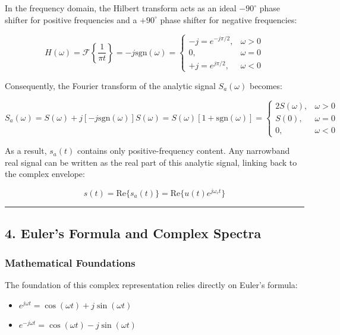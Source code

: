 \documentclass[
]{article}
\providecommand{\tightlist}{%
  \setlength{\itemsep}{0pt}\setlength{\parskip}{0pt}}
\begin{document}
In the frequency domain, the Hilbert transform acts as an ideal
\(-90^\circ\) phase shifter for positive frequencies and a \(+90^\circ\)
phase shifter for negative frequencies:

\[H(\omega) = \mathcal{F}\left\{\frac{1}{\pi t}\right\} = -j \text{sgn}(\omega) = \begin{cases} -j = e^{-j\pi/2}, & \omega > 0 \\ 0, & \omega = 0 \\ +j = e^{j\pi/2}, & \omega < 0 \end{cases}\]

Consequently, the Fourier transform of the analytic signal
\(S_a(\omega)\) becomes:

\[S_a(\omega) = S(\omega) + j [-j \text{sgn}(\omega)] S(\omega) = S(\omega) [1 + \text{sgn}(\omega)] = \begin{cases} 2S(\omega), & \omega > 0 \\ S(0), & \omega = 0 \\ 0, & \omega < 0 \end{cases}\]

As a result, \(s_a(t)\) contains only positive-frequency content. Any
narrowband real signal can be written as the real part of this analytic
signal, linking back to the complex envelope:

\[s(t) = \text{Re}\{ s_a(t) \} = \text{Re}\{ u(t) e^{j \omega_c t} \}\]

\begin{center}\rule{0.5\linewidth}{0.5pt}\end{center}

\subsection{4. Euler's Formula and Complex
Spectra}\label{eulers-formula-and-complex-spectra}

\subsubsection{Mathematical Foundations}\label{mathematical-foundations}

The foundation of this complex representation relies directly on Euler's
formula:

\begin{itemize}
\tightlist
\item
  \(e^{j\omega t} = \cos(\omega t) + j\sin(\omega t)\)
\item
  \(e^{-j\omega t} = \cos(\omega t) - j\sin(\omega t)\)
\end{itemize}
\end{document}
